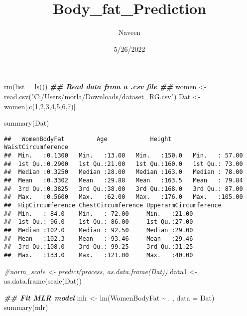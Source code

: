 \documentclass[
]{article}
\title{Body\_fat\_Prediction}
\author{Naveen}
\date{5/26/2022}
\newenvironment{Shaded}{\begin{snugshade}}{\end{snugshade}}
\newcommand{\AttributeTok}[1]{\textcolor[rgb]{0.77,0.63,0.00}{#1}}
\newcommand{\CommentTok}[1]{\textcolor[rgb]{0.56,0.35,0.01}{\textit{#1}}}
\newcommand{\DecValTok}[1]{\textcolor[rgb]{0.00,0.00,0.81}{#1}}
\newcommand{\DocumentationTok}[1]{\textcolor[rgb]{0.56,0.35,0.01}{\textbf{\textit{#1}}}}
\newcommand{\FunctionTok}[1]{\textcolor[rgb]{0.00,0.00,0.00}{#1}}
\newcommand{\NormalTok}[1]{#1}
\newcommand{\OtherTok}[1]{\textcolor[rgb]{0.56,0.35,0.01}{#1}}
\newcommand{\SpecialCharTok}[1]{\textcolor[rgb]{0.00,0.00,0.00}{#1}}
\newcommand{\StringTok}[1]{\textcolor[rgb]{0.31,0.60,0.02}{#1}}
\begin{document}
\maketitle

\begin{Shaded}
\begin{Highlighting}[]
\FunctionTok{rm}\NormalTok{(}\AttributeTok{list =} \FunctionTok{ls}\NormalTok{())}
\DocumentationTok{\#\# Read data from a .csv file \#\#}
\NormalTok{women }\OtherTok{\textless{}{-}} \FunctionTok{read.csv}\NormalTok{(}\StringTok{"C:/Users/morla/Downloads/dataset\_RG.csv"}\NormalTok{)}
\NormalTok{Dat }\OtherTok{\textless{}{-}}\NormalTok{ women[,}\FunctionTok{c}\NormalTok{(}\DecValTok{1}\NormalTok{,}\DecValTok{2}\NormalTok{,}\DecValTok{3}\NormalTok{,}\DecValTok{4}\NormalTok{,}\DecValTok{5}\NormalTok{,}\DecValTok{6}\NormalTok{,}\DecValTok{7}\NormalTok{)]}
\end{Highlighting}
\end{Shaded}

\begin{Shaded}
\begin{Highlighting}[]
\FunctionTok{summary}\NormalTok{(Dat)}
\end{Highlighting}
\end{Shaded}

\begin{verbatim}
##   WomenBodyFat         Age            Height      WaistCircumference
##  Min.   :0.1300   Min.   :13.00   Min.   :150.0   Min.   : 57.00    
##  1st Qu.:0.2900   1st Qu.:21.00   1st Qu.:160.0   1st Qu.: 73.00    
##  Median :0.3250   Median :28.00   Median :163.0   Median : 78.00    
##  Mean   :0.3302   Mean   :29.88   Mean   :163.5   Mean   : 79.84    
##  3rd Qu.:0.3825   3rd Qu.:38.00   3rd Qu.:168.0   3rd Qu.: 87.00    
##  Max.   :0.5600   Max.   :62.00   Max.   :176.0   Max.   :105.00    
##  HipCircumference ChestCircumference UpperarmCircumference
##  Min.   : 84.0    Min.   : 72.00     Min.   :21.00        
##  1st Qu.: 96.0    1st Qu.: 86.00     1st Qu.:27.00        
##  Median :102.0    Median : 92.50     Median :29.00        
##  Mean   :102.3    Mean   : 93.46     Mean   :29.46        
##  3rd Qu.:108.0    3rd Qu.: 99.25     3rd Qu.:31.25        
##  Max.   :133.0    Max.   :121.00     Max.   :40.00
\end{verbatim}

\begin{Shaded}
\begin{Highlighting}[]
\CommentTok{\#norm\_scale \textless{}{-} predict(process, as.data.frame(Dat))}
\NormalTok{data1 }\OtherTok{\textless{}{-}} \FunctionTok{as.data.frame}\NormalTok{(}\FunctionTok{scale}\NormalTok{(Dat))}

\DocumentationTok{\#\# Fit MLR model}
\NormalTok{mlr }\OtherTok{\textless{}{-}} \FunctionTok{lm}\NormalTok{(WomenBodyFat }\SpecialCharTok{\textasciitilde{}}\NormalTok{ . , }\AttributeTok{data =}\NormalTok{ Dat)}
\FunctionTok{summary}\NormalTok{(mlr)}
\end{Highlighting}
\end{Shaded}
\end{document}
